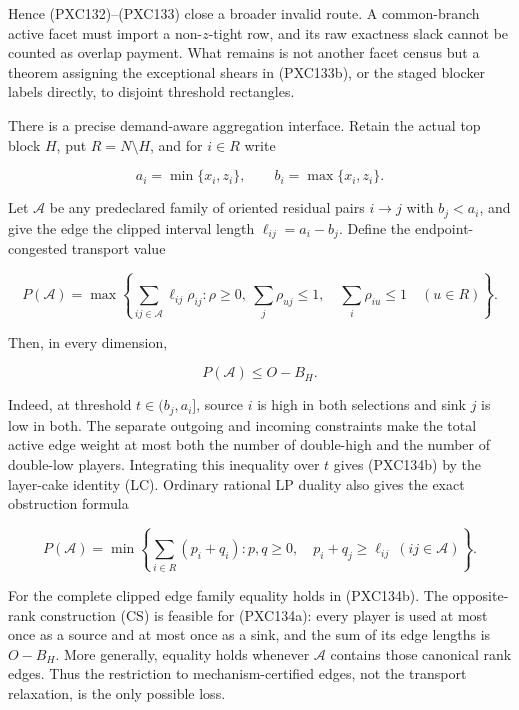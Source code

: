 \documentclass[11pt]{article}
\begin{document}
Hence (PXC132)--(PXC133) close a broader invalid route.  A common-branch
active facet must import a non-\(z\)-tight row, and its raw exactness slack
cannot be counted as overlap payment.  What remains is not another facet
census but a theorem assigning the exceptional shears in (PXC133b), or the
staged blocker labels directly, to disjoint threshold rectangles.

There is a precise demand-aware aggregation interface.  Retain the actual
top block \(H\), put \(R=N\setminus H\), and for \(i\in R\) write

\[
 a_i=\min\{x_i,z_i\},\qquad b_i=\max\{x_i,z_i\}.
\]

Let \(\mathcal A\) be any predeclared family of oriented residual pairs
\(i\to j\) with \(b_j<a_i\), and give the edge the clipped interval length
\(\ell_{ij}=a_i-b_j\).  Define the endpoint-congested transport value

\begin{equation}
 P(\mathcal A)=\max\left\{
 \sum_{ij\in\mathcal A}\ell_{ij}\rho_{ij}:
 \rho\ge0,
 \ \sum_j\rho_{uj}\le1,\quad\sum_i\rho_{iu}\le1
 \quad(u\in R)
 \right\}.                                                \tag{PXC134a}
\end{equation}

Then, in every dimension,

\begin{equation}
                 P(\mathcal A)\le O-B_H.                  \tag{PXC134b}
\end{equation}

Indeed, at threshold \(t\in(b_j,a_i]\), source \(i\) is high in both
selections and sink \(j\) is low in both.  The separate outgoing and incoming
constraints make the total active edge weight at most both the number of
double-high and the number of double-low players.  Integrating this
inequality over \(t\) gives
(PXC134b) by the layer-cake identity (LC).  Ordinary rational LP duality also
gives the exact obstruction formula

\begin{equation}
 P(\mathcal A)=\min\left\{
 \sum_{i\in R}(p_i+q_i):p,q\ge0,\quad
 p_i+q_j\ge\ell_{ij}\ (ij\in\mathcal A)
 \right\}.                                                \tag{PXC134c}
\end{equation}

For the complete clipped edge family equality holds in (PXC134b).  The
opposite-rank construction (CS) is feasible for (PXC134a): every player is
used at most once as a source and at most once as a sink, and the sum of its
edge lengths is \(O-B_H\).  More generally, equality holds whenever
\(\mathcal A\) contains those canonical rank edges.  Thus the restriction to
mechanism-certified edges, not the transport relaxation, is the only possible
loss.
\end{document}
